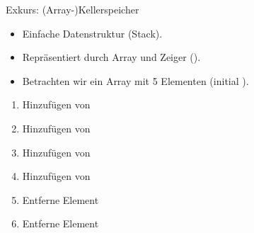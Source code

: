 \begin{frame}[fragile]{Exkurs: (Array-)Kellerspeicher}
    \begin{itemize}[<+(1)->]
        \item Einfache Datenstruktur (Stack). 
        \item Repräsentiert durch Array und Zeiger ().
        \item \strut Betrachten wir ein Array mit 5 Elementen (initial ).\smallskip\\
%
    \end{itemize}
    \begin{multicols}{3}
    \begin{enumerate}[<+(1)->]
        \item \strut Hinzufügen von \\ 
        \item \strut Hinzufügen von \\ 
        \item \strut Hinzufügen von \\ 
        \item \strut Hinzufügen von \\ 
        \item \strut Entferne Element\\ 
        \item \strut Entferne Element\\ 
    \end{enumerate}
    \end{multicols}
\end{frame}

